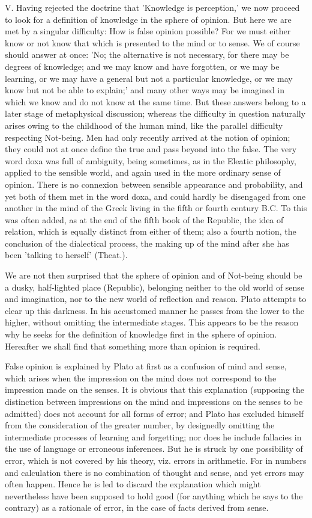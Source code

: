 V. Having rejected the doctrine that 'Knowledge is perception,' we now
proceed to look for a definition of knowledge in the sphere of opinion.
But here we are met by a singular difficulty: How is false opinion
possible? For we must either know or not know that which is presented
to the mind or to sense. We of course should answer at once: 'No; the
alternative is not necessary, for there may be degrees of knowledge; and
we may know and have forgotten, or we may be learning, or we may have a
general but not a particular knowledge, or we may know but not be able
to explain;' and many other ways may be imagined in which we know and do
not know at the same time. But these answers belong to a later stage of
metaphysical discussion; whereas the difficulty in question naturally
arises owing to the childhood of the human mind, like the parallel
difficulty respecting Not-being. Men had only recently arrived at the
notion of opinion; they could not at once define the true and pass
beyond into the false. The very word doxa was full of ambiguity, being
sometimes, as in the Eleatic philosophy, applied to the sensible world,
and again used in the more ordinary sense of opinion. There is no
connexion between sensible appearance and probability, and yet both
of them met in the word doxa, and could hardly be disengaged from one
another in the mind of the Greek living in the fifth or fourth century
B.C. To this was often added, as at the end of the fifth book of the
Republic, the idea of relation, which is equally distinct from either of
them; also a fourth notion, the conclusion of the dialectical process,
the making up of the mind after she has been 'talking to herself'
(Theat.).

We are not then surprised that the sphere of opinion and of Not-being
should be a dusky, half-lighted place (Republic), belonging neither
to the old world of sense and imagination, nor to the new world of
reflection and reason. Plato attempts to clear up this darkness. In
his accustomed manner he passes from the lower to the higher, without
omitting the intermediate stages. This appears to be the reason why he
seeks for the definition of knowledge first in the sphere of opinion.
Hereafter we shall find that something more than opinion is required.

False opinion is explained by Plato at first as a confusion of mind and
sense, which arises when the impression on the mind does not correspond
to the impression made on the senses. It is obvious that this
explanation (supposing the distinction between impressions on the mind
and impressions on the senses to be admitted) does not account for all
forms of error; and Plato has excluded himself from the consideration of
the greater number, by designedly omitting the intermediate processes
of learning and forgetting; nor does he include fallacies in the use of
language or erroneous inferences. But he is struck by one possibility
of error, which is not covered by his theory, viz. errors in arithmetic.
For in numbers and calculation there is no combination of thought and
sense, and yet errors may often happen. Hence he is led to discard the
explanation which might nevertheless have been supposed to hold good
(for anything which he says to the contrary) as a rationale of error, in
the case of facts derived from sense.


